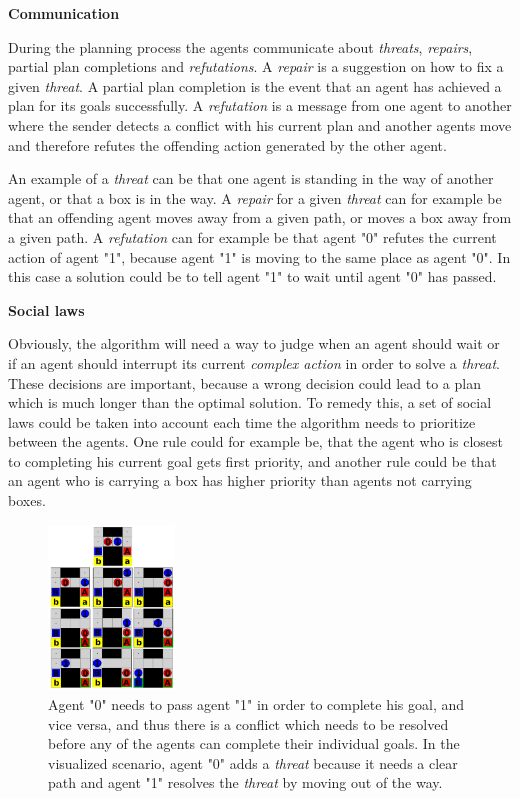 \documentclass[Main]{subfiles}
\begin{document}
\textbf{Communication}

During the planning process the agents communicate about \textit{threats}, \textit{repairs}, partial plan completions and \textit{refutations}.
A \textit{repair} is a suggestion on how to fix a given \textit{threat}.
A partial plan completion is the event that an agent has achieved a plan for its goals successfully.
A \textit{refutation} is a message from one agent to another where the sender detects a conflict with his current plan and another agents move and therefore refutes the offending action generated by the other agent.

An example of a \textit{threat} can be that one agent is standing in the way of another agent, or that a box is in the way.
A \textit{repair} for a given \textit{threat} can for example be that an offending agent moves away from a given path, or moves a box away from a given path.
A \textit{refutation} can for example be that agent "0" refutes the current action of agent "1", because agent "1" is moving to the same place as agent "0". In this case a solution could be to tell agent "1" to wait until agent "0" has passed.


\textbf{Social laws}

Obviously, the algorithm will need a way to judge when an agent should wait or if an agent should interrupt its current \textit{complex action} in order to solve a \textit{threat}. These decisions are important, because a wrong decision could lead to a plan which is much longer than the optimal solution.
To remedy this, a set of social laws could be taken into account each time the algorithm needs to prioritize between the agents.
One rule could for example be, that the agent who is closest to completing his current goal gets first priority, and another rule could be that an agent who is carrying a box has higher priority than agents not carrying boxes.

\begin{figure}[h!]
	\centering
	\includegraphics[width=0.3\textwidth]{plan_collab.png}
	\caption{Agent "0" needs to pass agent "1" in order to complete his goal, and vice versa, and thus there is a conflict which needs to be resolved before any of the agents can complete their individual goals. In the visualized scenario, agent "0" adds a \textit{threat} because it needs a clear path and agent "1" resolves the \textit{threat} by moving out of the way.}
	\label{fig:plan_collab}
\end{figure}
\end{document}
